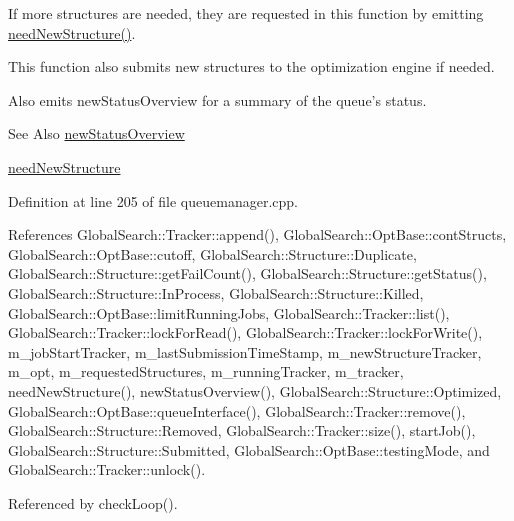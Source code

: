 If more structures are needed, they are requested in this function by emitting \hyperlink{classGlobalSearch_1_1QueueManager_a4b50dbd51e53b1d0d5cb93e9d7380c1c}{need\-New\-Structure()}.

This function also submits new structures to the optimization engine if needed.

Also emits new\-Status\-Overview for a summary of the queue's status.

\begin{DoxySeeAlso}{See Also}
\hyperlink{classGlobalSearch_1_1QueueManager_af37eb7a9e54e347a81dc3a1e373c8d54}{new\-Status\-Overview} 

\hyperlink{classGlobalSearch_1_1QueueManager_a4b50dbd51e53b1d0d5cb93e9d7380c1c}{need\-New\-Structure} 
\end{DoxySeeAlso}


Definition at line 205 of file queuemanager.\-cpp.



References Global\-Search\-::\-Tracker\-::append(), Global\-Search\-::\-Opt\-Base\-::cont\-Structs, Global\-Search\-::\-Opt\-Base\-::cutoff, Global\-Search\-::\-Structure\-::\-Duplicate, Global\-Search\-::\-Structure\-::get\-Fail\-Count(), Global\-Search\-::\-Structure\-::get\-Status(), Global\-Search\-::\-Structure\-::\-In\-Process, Global\-Search\-::\-Structure\-::\-Killed, Global\-Search\-::\-Opt\-Base\-::limit\-Running\-Jobs, Global\-Search\-::\-Tracker\-::list(), Global\-Search\-::\-Tracker\-::lock\-For\-Read(), Global\-Search\-::\-Tracker\-::lock\-For\-Write(), m\-\_\-job\-Start\-Tracker, m\-\_\-last\-Submission\-Time\-Stamp, m\-\_\-new\-Structure\-Tracker, m\-\_\-opt, m\-\_\-requested\-Structures, m\-\_\-running\-Tracker, m\-\_\-tracker, need\-New\-Structure(), new\-Status\-Overview(), Global\-Search\-::\-Structure\-::\-Optimized, Global\-Search\-::\-Opt\-Base\-::queue\-Interface(), Global\-Search\-::\-Tracker\-::remove(), Global\-Search\-::\-Structure\-::\-Removed, Global\-Search\-::\-Tracker\-::size(), start\-Job(), Global\-Search\-::\-Structure\-::\-Submitted, Global\-Search\-::\-Opt\-Base\-::testing\-Mode, and Global\-Search\-::\-Tracker\-::unlock().



Referenced by check\-Loop().

